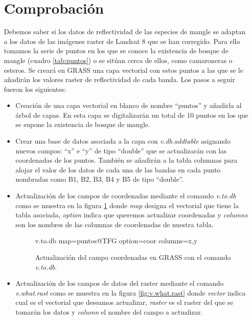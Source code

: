 \section{Comprobación}
Debemos saber si los datos de reflectividad de las especies de mangle se adaptan a los datos de las imágenes raster de Landsat 8 que se han corregido. Para ello tomamos la serie de puntos en los que se conoce la existencia de bosque de mangle (cuadro \ref{tab:puntos}) o se sitúan cerca de ellos, como camaroneras o esteros. Se creará en GRASS una capa vectorial con estos puntos a las que se le añadirán los valores raster de reflectividad de cada banda. Los pasos a seguir fueron los siguientes:

\begin{itemize}
	\item Creación de una capa vectorial en blanco de nombre ``puntos'' y añadirla al árbol de capas. En esta capa se digitalizarán un total de 10 puntos en los que se supone la existencia de bosque de mangle.
	\item Crear una base de datos asociada a la capa con \textit{v.db.addtable} asignando nuevos campos: ``x'' e ``y'' de tipo ``double'' que se actualizarán con las coordenadas de los puntos. También se añadirán a la tabla columnas para alojar el valor de los datos de cada una de las bandas en cada punto nombradas como B1, B2, B3, B4 y B5 de tipo ``double''.
	\item Actualización de los campos de coordenadas mediante el comando \textit{v.to.db} como se muestra en la figura \ref{fig:v.to.db} donde \textit{map} designa el vectorial que tiene la tabla asociada, \textit{option} indica que queremos actualizar coordenadas y \textit{columns} son los nombres de las columnas de coordenadas de nuestra tabla.
	
\begin{figure}[ht]
\centering
\begin{boxedverbatim}
	v.to.db map=puntos@TFG option=coor columns=x,y
\end{boxedverbatim}
\caption[Actualización de coordenadas]{Actualización del campo coordenadas en GRASS con el comando \textit{v.to.db}.}
\label{fig:v.to.db}
\end{figure}	
	
	\item Actualización de los campos de datos del raster mediante el comando \textit{v.what.rast} como se muestra en la figura \ref{fig:v.what.rast} donde \textit{vector} indica cual es el vectorial que deseamos actualizar, \textit{raster} es el raster del que se tomarán los datos y \textit{column} el nombre del campo a actualizar.
\end{itemize}


